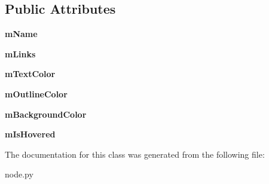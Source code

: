 \subsection*{Public Attributes}
\begin{DoxyCompactItemize}
\item 
\hypertarget{classnode_1_1Node_a9a03095e01eda669960391585e418d30}{{\bfseries m\-Name}}\label{classnode_1_1Node_a9a03095e01eda669960391585e418d30}

\item 
\hypertarget{classnode_1_1Node_a768c7ab238ce889a3951337a110dc772}{{\bfseries m\-Links}}\label{classnode_1_1Node_a768c7ab238ce889a3951337a110dc772}

\item 
\hypertarget{classnode_1_1Node_a5e6d3c337b1d054ab512ace98b5ff462}{{\bfseries m\-Text\-Color}}\label{classnode_1_1Node_a5e6d3c337b1d054ab512ace98b5ff462}

\item 
\hypertarget{classnode_1_1Node_a48a508237dad7491d55715f9f3b540d1}{{\bfseries m\-Outline\-Color}}\label{classnode_1_1Node_a48a508237dad7491d55715f9f3b540d1}

\item 
\hypertarget{classnode_1_1Node_a1b83554e574d5aebc6bb623b3c2af892}{{\bfseries m\-Background\-Color}}\label{classnode_1_1Node_a1b83554e574d5aebc6bb623b3c2af892}

\item 
\hypertarget{classnode_1_1Node_a4c242e59ede1fd576599f84e834e76c0}{{\bfseries m\-Is\-Hovered}}\label{classnode_1_1Node_a4c242e59ede1fd576599f84e834e76c0}

\end{DoxyCompactItemize}


The documentation for this class was generated from the following file\-:\begin{DoxyCompactItemize}
\item 
node.\-py\end{DoxyCompactItemize}
